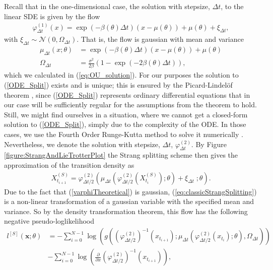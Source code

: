 Recall that in the one-dimensional case, the solution with stepsize, $\Delta t$, to the linear SDE is given by the flow
\begin{align}
    \varphi_{\Delta t}^{(1)}(x) = \exp\left(-\beta\left(\theta\right) \Delta t\right)\left(x - \mu\left(\theta\right)\right) + \mu\left(\theta\right) + \xi_{\Delta t}, \label{varphiTheoretical}
\end{align}
with $\xi_{\Delta t}\sim\mathcal{N}\left(0, \Omega_{\Delta t}\right)$. That is, the flow is gaussian with mean and variance
\begin{align}
    \mu_{\Delta t}(x; \theta) &= \exp\left(-\beta\left(\theta\right) \Delta t\right)\left(x - \mu\left(\theta\right)\right) + \mu\left(\theta\right) \label{linearSDEMean}\\
    \Omega_{\Delta t} &= \frac{\sigma^2}{2\beta}\left(1 - \exp\left(-2\beta\left(\theta\right)\Delta t\right)\right), \label{linearSDEVariance}
\end{align}
which we calculated in (\ref{eq:OU_solution}). For our purposes the solution to (\ref{ODE_Split}) exists and is unique; this is ensured by the Picard-Lindelöf theorem \cite[section 2.7]{Srkk2019}, since (\ref{ODE_Split}) represents ordinary differential equations that in our case will be sufficiently regular for the assumptions from the theorem to hold. Still, we might find ourselves in a situation, where we cannot get a closed-form solution to (\ref{ODE_Split}), simply due to the complexity of the ODE. In those cases, we use the Fourth Order Runge-Kutta method to solve it numerically \cite[p.541 equation (8)]{numericalAnalysis}.  
Nevertheless, we denote the solution with stepsize, $\Delta t$, $\varphi_{\Delta t}^{(2)}$. By Figure \ref{figure:StrangAndLieTrotterPlot} the Strang splitting scheme then gives the approximation of the transition density as 
\begin{align}
    X_{t_{i+1}}^{(S)} = \varphi_{\Delta t / 2}^{(2)}\left(\mu_{\Delta t}\left(\varphi_{\Delta t/2}^{(2)}\left(X_{t_{i}}^{(S)}\right); \theta\right) + \xi_{\Delta t} \; ; \theta \right). \label{eq:classicStrangSplitting}
\end{align}
Due to the fact that (\ref{varphiTheoretical}) is gaussian, (\ref{eq:classicStrangSplitting}) is a non-linear transformation of a gaussian variable with the specified mean and variance. So by the density transformation theorem, this flow has the following negative pseudo-loglikelihood 
\begin{align}
    l^{[S]}(\mathbf{x}; \theta) &= -\sum_{i = 0}^{N - 1}\log\left(g\left(\left(\varphi_{\Delta t / 2}^{(2)}\right)^{-1}\left(x_{t_{i+1}}\right); \mu_{\Delta t}\left(\varphi_{\Delta t/2}^{(2)}\left(x_{t_{i}}\right); \theta \right), \Omega_{\Delta t} \right) \right) \nonumber \\
    &- \sum_{i = 0}^{N - 1}\log\left(\frac{\partial}{\partial x}\left(\varphi_{\Delta t / 2}^{(2)}\right)^{-1}\left(x_{t_{i + 1}}\right) \right), \label{eq:Strang_likelihood}
\end{align}
